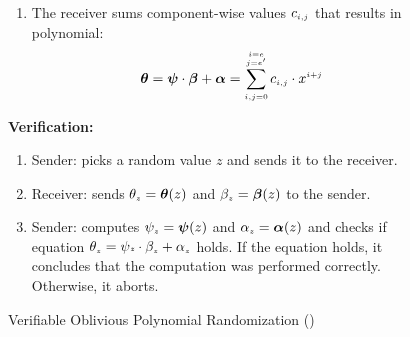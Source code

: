 \begin{figure}[!htb]
\begin{center}
{\begin{tcolorbox}[enhanced,width=4.75in, 
    drop fuzzy shadow southwest,
    colframe=black,colback=white]
\begin{enumerate}[leftmargin=1mm]
{\begin{enumerate} [leftmargin=3mm]
 \item The receiver sums component-wise values $c_{\scriptscriptstyle i,j}$  that results in polynomial:
 \vspace{-2mm}
  $$\bm\theta=\bm\psi\cdot \bm\beta+\bm\alpha=\sum\limits^{\substack{\scriptscriptstyle i=e\\ \scriptscriptstyle j=e'}}_{\scriptscriptstyle i,j=0}c_{\scriptscriptstyle i, j}\cdot x^{\scriptscriptstyle i+j}$$ 
  \vspace{-2mm}
 




\end{enumerate}
\vs
\item \label{Verification} \textbf{Verification:}
\begin{enumerate}[leftmargin=3mm]

\item \label{picking-random-x}Sender: picks a random value  $z$ and sends it to the receiver. 


\item\label{receiver-OLE-invocation} Receiver: sends $\theta_{\scriptscriptstyle z}=\bm\theta(z)$ and $\beta_{\scriptscriptstyle z}=\bm\beta(z)$ to the sender.

\item\label{receiver-OLE-invocation} Sender:  computes $\psi_{\scriptscriptstyle z}=\bm\psi(z)$ and $\alpha_{\scriptscriptstyle z}=\bm\alpha(z)$ and checks   if equation  $\theta_{\scriptscriptstyle z}=\psi{\scriptscriptstyle z}\cdot \beta_{\scriptscriptstyle z}+\alpha_{\scriptscriptstyle z}$ holds. If the equation holds, it concludes that the computation was performed correctly. Otherwise, it aborts. 
%
\vs
\end{enumerate}
}
 \end{enumerate}
 \end{tcolorbox}
 }
\end{center}
\vs
\vs
\caption{Verifiable Oblivious Polynomial Randomization ({\vopr}) } 
\label{fig:VOPR}
\end{figure}
